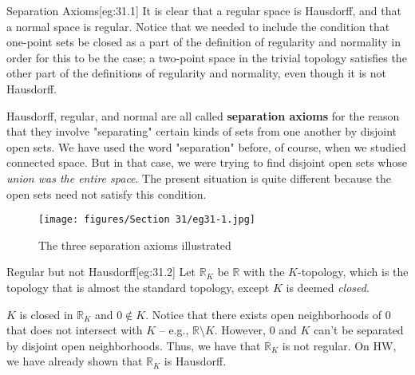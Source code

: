 \begin{egBox}{Separation Axioms}[eg:31.1]
    It is clear that a regular space is Hausdorff, and that a normal space is
    regular.
    Notice that we needed to include the condition that one-point sets be
    closed as a part of the definition of regularity and normality in order 
    for this to be the case; a two-point space in the trivial topology satisfies
    the other part of the definitions of regularity and normality, even though
    it is not Hausdorff.

    \baseSkip

    Hausdorff, regular, and normal are all called \textbf{separation axioms}
    for the reason that they involve "separating" certain kinds of sets from
    one another by disjoint open sets.
    We have used the word "separation" before, of course, when we studied
    connected space. But in that case, we were trying to find disjoint open sets
    whose \textit{union was the entire space}.
    The present situation is quite different because the open sets need not
    satisfy this condition.

    \baseSkip

    \begin{figure}[H]
        \centering
        \texttt{[image: figures/Section 31/eg31-1.jpg]}
        \caption{The three separation axioms illustrated}
        \label{fig:31-1}
    \end{figure}
\end{egBox}

\begin{egBox}{Regular but not Hausdorff}[eg:31.2]
    Let \( \mathbb{R}_{ K } \) be \( \mathbb{R} \) with the \( K \)-topology,
    which is the topology that is almost the standard topology, except 
    \( K \) is deemed \textit{closed}.

    \baseSkip

    \( K \) is closed in \( \mathbb{R}_{ K } \) and \( 0 \notin K \).
    Notice that there exists open neighborhoods of \( 0 \) that does not
    intersect with \( K \) -- e.g., \( \mathbb{R} \setminus K \).
    However, \( 0 \) and \( K \) can't be separated by disjoint open 
    neighborhoods. 
    Thus, we have that \( \mathbb{R}_{ K } \) is not regular.
    On HW, we have already shown that \( \mathbb{R}_{ K } \) is Hausdorff.
\end{egBox}